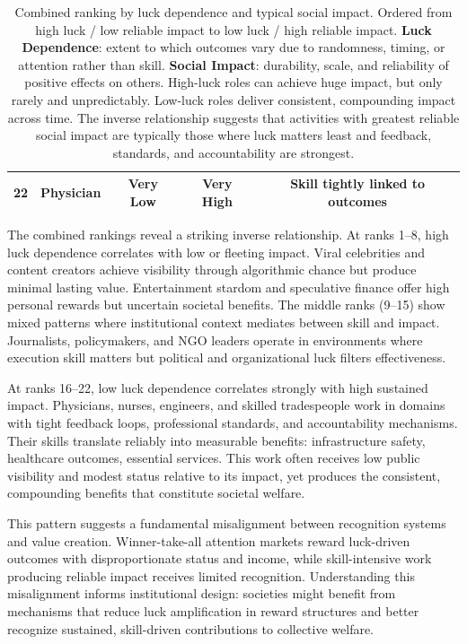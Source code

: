 \begin{table}[H]
\begin{tabular}{clccc}
    22                     & Physician                               & Very Low            & Very High          & Skill tightly linked to outcomes  \\
    \bottomrule
  \end{tabular}
  \caption{Combined ranking by luck dependence and typical social impact.
  Ordered from high luck / low reliable impact to low luck / high reliable
  impact. \textbf{Luck Dependence}: extent to which outcomes vary due to
  randomness, timing, or attention rather than skill. \textbf{Social
  Impact}: durability, scale, and reliability of positive effects on others.
  High-luck roles can achieve huge impact, but only rarely and unpredictably.
  Low-luck roles deliver consistent, compounding impact across time. The
  inverse relationship suggests that activities with greatest reliable
  social impact are typically those where luck matters least and
  feedback, standards, and accountability are strongest.}
  \label{tab:combined_rankings}
\end{table}

The combined rankings reveal a striking inverse relationship. At ranks 1--8,
high luck dependence correlates with low or fleeting impact. Viral celebrities
and content creators achieve visibility through algorithmic chance but produce
minimal lasting value. Entertainment stardom and speculative finance
offer high personal rewards but uncertain societal benefits. The middle ranks
(9--15) show mixed patterns where institutional context mediates between
skill and impact. Journalists, policymakers, and NGO leaders operate in environments
where execution skill matters but political and organizational luck filters
effectiveness.

At ranks 16--22, low luck dependence correlates strongly with high sustained
impact. Physicians, nurses, engineers, and skilled tradespeople work in domains
with tight feedback loops, professional standards, and accountability mechanisms.
Their skills translate reliably into measurable benefits: infrastructure
safety, healthcare outcomes, essential services. This work often
receives low public visibility and modest status relative to its impact,
yet produces the consistent, compounding benefits that constitute
societal welfare.

This pattern suggests a fundamental misalignment between recognition
systems and value creation. Winner-take-all attention markets reward luck-driven
outcomes with disproportionate status and income, while skill-intensive
work producing reliable impact receives limited recognition. Understanding
this misalignment informs institutional design: societies might benefit
from mechanisms that reduce luck amplification in reward structures and
better recognize sustained, skill-driven contributions to collective welfare.


